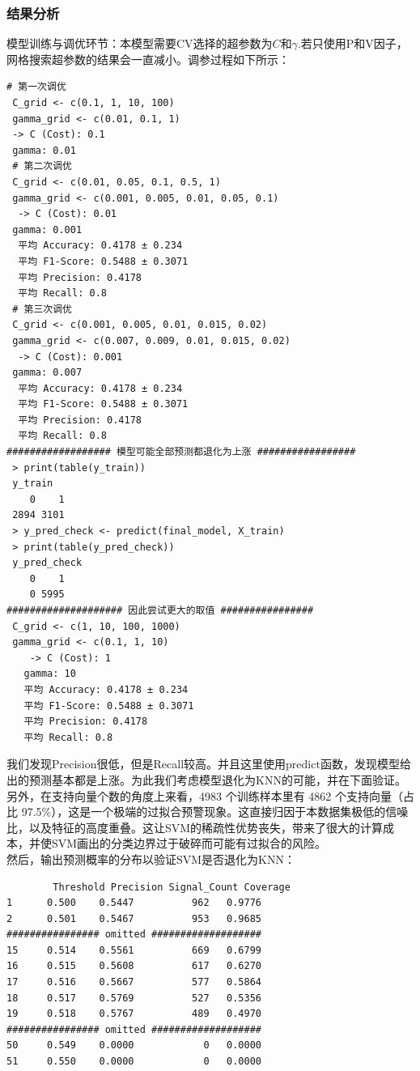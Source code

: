 \documentclass[11pt, a4paper]{article}
\begin{document}
\subsubsection{结果分析}
    模型训练与调优环节：本模型需要CV选择的超参数为$C$和$\gamma$.若只使用P和V因子，网格搜索超参数的结果会一直减小。调参过程如下所示：
    \begin{verbatim}
# 第一次调优
 C_grid <- c(0.1, 1, 10, 100)
 gamma_grid <- c(0.01, 0.1, 1)
 -> C (Cost): 0.1 
 gamma: 0.01
 # 第二次调优
 C_grid <- c(0.01, 0.05, 0.1, 0.5, 1)
 gamma_grid <- c(0.001, 0.005, 0.01, 0.05, 0.1)
  -> C (Cost): 0.01
 gamma: 0.001
  平均 Accuracy: 0.4178 ± 0.234
  平均 F1-Score: 0.5488 ± 0.3071
  平均 Precision: 0.4178
  平均 Recall: 0.8
 # 第三次调优
 C_grid <- c(0.001, 0.005, 0.01, 0.015, 0.02)
 gamma_grid <- c(0.007, 0.009, 0.01, 0.015, 0.02)
  -> C (Cost): 0.001
 gamma: 0.007
  平均 Accuracy: 0.4178 ± 0.234
  平均 F1-Score: 0.5488 ± 0.3071
  平均 Precision: 0.4178 
  平均 Recall: 0.8
################## 模型可能全部预测都退化为上涨 #################
 > print(table(y_train))
 y_train
    0    1
 2894 3101
 > y_pred_check <- predict(final_model, X_train)
 > print(table(y_pred_check))
 y_pred_check
    0    1
    0 5995
#################### 因此尝试更大的取值 ################
 C_grid <- c(1, 10, 100, 1000)
 gamma_grid <- c(0.1, 1, 10)
    -> C (Cost): 1
   gamma: 10
   平均 Accuracy: 0.4178 ± 0.234
   平均 F1-Score: 0.5488 ± 0.3071
   平均 Precision: 0.4178
   平均 Recall: 0.8 
    \end{verbatim}
    我们发现Precision很低，但是Recall较高。并且这里使用$\text{predict}$函数，发现模型给出的预测基本都是上涨。为此我们考虑模型退化为KNN的可能，并在下面验证。另外，在支持向量个数的角度上来看，4983 个训练样本里有 4862 个支持向量（占比 97.5\%），这是一个极端的过拟合预警现象。这直接归因于本数据集极低的信噪比，以及特征的高度重叠。这让SVM的稀疏性优势丧失，带来了很大的计算成本，并使SVM画出的分类边界过于破碎而可能有过拟合的风险。\\然后，输出预测概率的分布以验证SVM是否退化为KNN：
    \begin{verbatim}
        Threshold Precision Signal_Count Coverage
1      0.500    0.5447          962   0.9776
2      0.501    0.5467          953   0.9685
################ omitted ###################
15     0.514    0.5561          669   0.6799
16     0.515    0.5608          617   0.6270
17     0.516    0.5667          577   0.5864
18     0.517    0.5769          527   0.5356
19     0.518    0.5767          489   0.4970
################ omitted ###################
50     0.549    0.0000            0   0.0000
51     0.550    0.0000            0   0.0000
    \end{verbatim}
\end{document}
